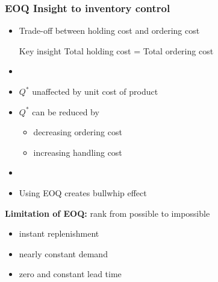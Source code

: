 \documentclass[10pt,handout,notes=show]{beamer}
\begin{document}
  \begin{frame}
  \frametitle{EOQ Insight to inventory control}

  \begin{itemize}
    \item Trade-off between \alert{holding cost} and \alert{ordering cost}
    \begin{minipage}{0.8\textwidth}
      \begin{alertblock}{\small{Key insight}}{}
        Total holding cost = Total ordering cost
      \end{alertblock}
    \end{minipage}
    \item[]
    \item $Q^{*}$ \alert{unaffected} by unit cost of product
    \item $Q^{*}$ can be reduced by
    \begin{minipage}{0.8\textwidth}
      \begin{block}{}{}
      \begin{itemize}
        \item<2-> decreasing \alert{ordering cost} 
        \item<2-> increasing handling cost 
      \end{itemize}
      \end{block}
    \end{minipage}
    \item[]


    \item Using EOQ creates \alert{bullwhip effect}
  \end{itemize}

  \NextLine
  \textbf{Limitation of EOQ:} rank from possible to impossible
  \begin{itemize}
    \item<3-> instant replenishment
    \item<3-> nearly constant demand
    \item<3-> zero and constant lead time
  \end{itemize}

  \end{frame}
\end{document}
